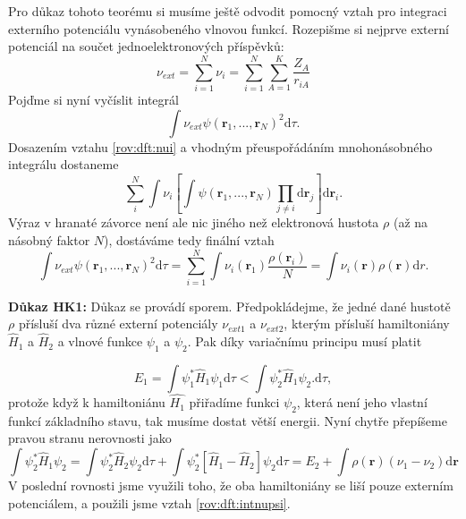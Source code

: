 \bigskip
Pro důkaz tohoto teorému si musíme ještě odvodit pomocný vztah pro integraci externího potenciálu vynásobeného vlnovou funkcí.
Rozepišme si nejprve externí potenciál na součet jednoelektronových příspěvků:
\begin{equation}
\nu_{ext}=\sum_{i=1}^N \nu_i = \sum_{i=1}^N \sum_{A=1}^K \frac{Z_A}{r_{iA}}  
\label{rov:dft:nui}
\end{equation}
Pojďme si nyní vyčíslit integrál
\begin{equation}
\int \nu_{ext} \psi(\textbf{r}_1,...,\textbf{r}_N)^2\mathrm{d}\tau .
\end{equation}
Dosazením vztahu \eqref{rov:dft:nui} a vhodným přeuspořádáním mnohonásobného integrálu dostaneme
\begin{equation}
\sum_i^N \int \nu_i \left[\int \psi(\mathbf{r}_1,...,\mathbf{r}_N)\prod_{j\neq i}\mathrm{d}\textbf{r}_j\right] \mathrm{d}\textbf{r}_i .
\end{equation}
Výraz v hranaté závorce není ale nic jiného než elektronová hustota $\rho$ (až na násobný faktor $N$), dostáváme tedy finální vztah
\begin{equation}
\int \nu_{ext} \psi(\textbf{r}_1,...,\textbf{r}_N)^2\mathrm{d}\tau = \sum_{i=1}^N \int \nu_i(\textbf{r}_1)\frac{\rho(\textbf{r}_i)}{N}= \int \nu_i(\textbf{r})\rho(\textbf{r}) \mathrm{d}r .
\label{rov:dft:intnupsi}
\end{equation}

\bigskip 
\textbf{Důkaz HK1:} Důkaz se provádí sporem. Předpokládejme, že jedné dané hustotě $\rho$ přísluší dva různé externí potenciály $\nu_{ext1}$ a $\nu_{ext2}$, kterým přísluší hamiltoniány $\hat{H}_1$ a $\hat{H}_2$ a vlnové funkce $\psi_1$ a $\psi_2$.  Pak díky variačnímu principu musí platit

\begin{equation}
E_1 = \int \psi_1^* \hat{H}_1 \psi_1 \mathrm{d}\tau < \int \psi_2^* \hat{H}_1 \psi_2 . \mathrm{d}\tau ,
\end{equation}
protože když k hamiltoniánu $\hat{H_1}$ přiřadíme funkci $\psi_2$, která není jeho vlastní funkcí základního stavu, tak musíme dostat větší energii. Nyní chytře přepíšeme pravou stranu nerovnosti jako  
\begin{equation}
\int \psi_2^* \hat{H}_1 \psi_2 = \int \psi_2^* \hat{H}_2 \psi_2\mathrm{d}\tau  + \int \psi_2^* \left[\hat{H}_1-\hat{H}_2\right] \psi_2\mathrm{d}\tau = E_2 + \int \rho(\mathbf{r})(\nu_1-\nu_2)\mathrm{d}\mathbf{r}  
\end{equation}
V poslední rovnosti jsme využili toho, že oba hamiltoniány se liší pouze externím potenciálem, a použili jsme vztah \eqref{rov:dft:intnupsi}.

